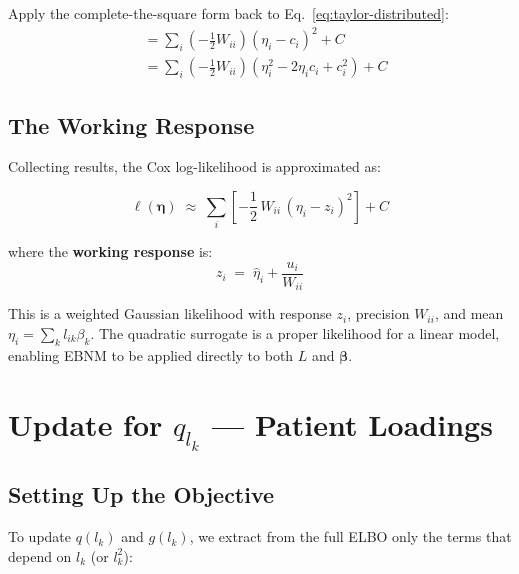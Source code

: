 \documentclass[11pt]{article}
\begin{document}
\begin{derivbox}
Apply the complete-the-square form back to Eq.~\eqref{eq:taylor-distributed}:
\begin{align}
  &= \sum_i \left(-\frac{1}{2}W_{ii}\right)\!\left(\eta_i - c_i\right)^2 + C
  \label{eq:taylor-ctsq}\\
  &= \sum_i \left(-\frac{1}{2}W_{ii}\right)\!
     \left(\eta_i^2 - 2\eta_i c_i + c_i^2\right) + C
  \label{eq:taylor-expand-back}
\end{align}

\end{derivbox}

\subsection{The Working Response}

Collecting results, the Cox log-likelihood is approximated as:

\begin{equation}\label{eq:taylor-quad}
  \ell(\bm{\eta}) \;\approx\;
  \sum_i \left[-\frac{1}{2}\,W_{ii}\,(\eta_i - z_i)^2\right] + C
\end{equation}

where the \textbf{working response} is:
\begin{equation}\label{eq:working-response}
  \boxed{z_i \;=\; \hat{\eta}_i + \frac{u_i}{W_{ii}}}
\end{equation}

This is a weighted Gaussian likelihood with response $z_i$, precision $W_{ii}$,
and mean $\eta_i = \sum_k l_{ik}\beta_k$.  The quadratic surrogate is a
proper likelihood for a linear model, enabling EBNM to be applied directly to
both $L$ and $\bm{\beta}$.

\section{Update for $q_{l_k}$ --- Patient Loadings}\label{sec:update-L}

\subsection{Setting Up the Objective}

To update $q(l_k)$ and $g(l_k)$, we extract from the full ELBO only the terms
that depend on $l_k$ (or $l_k^2$):
\end{document}
